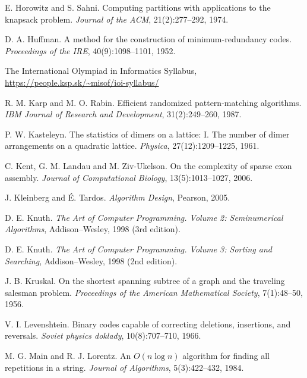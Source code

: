 \begin{thebibliography}{9}
  E. Horowitz and S. Sahni.
  Computing partitions with applications to the knapsack problem.
  \emph{Journal of the ACM}, 21(2):277--292, 1974.

  D. A. Huffman.
  A method for the construction of minimum-redundancy codes.
  \emph{Proceedings of the IRE}, 40(9):1098--1101, 1952.

  The International Olympiad in Informatics Syllabus,
  \url{https://people.ksp.sk/~misof/ioi-syllabus/}

  R. M. Karp and M. O. Rabin.
  Efficient randomized pattern-matching algorithms.
  \emph{IBM Journal of Research and Development}, 31(2):249--260, 1987.

  P. W. Kasteleyn.
  The statistics of dimers on a lattice: I. The number of dimer arrangements on a quadratic lattice.
  \emph{Physica}, 27(12):1209--1225, 1961.

  C. Kent, G. M. Landau and M. Ziv-Ukelson.
  On the complexity of sparse exon assembly.
  \emph{Journal of Computational Biology}, 13(5):1013--1027, 2006.


  J. Kleinberg and É. Tardos.
  \emph{Algorithm Design}, Pearson, 2005.

  D. E. Knuth.
  \emph{The Art of Computer Programming. Volume 2: Seminumerical Algorithms}, Addison–Wesley, 1998 (3rd edition).

  D. E. Knuth.
  \emph{The Art of Computer Programming. Volume 3: Sorting and Searching}, Addison–Wesley, 1998 (2nd edition).


  J. B. Kruskal.
  On the shortest spanning subtree of a graph and the traveling salesman problem.
  \emph{Proceedings of the American Mathematical Society}, 7(1):48--50, 1956.

  V. I. Levenshtein.
  Binary codes capable of correcting deletions, insertions, and reversals.
  \emph{Soviet physics doklady}, 10(8):707--710, 1966.

  M. G. Main and R. J. Lorentz.
  An $O(n \log n)$ algorithm for finding all repetitions in a string.
  \emph{Journal of Algorithms}, 5(3):422--432, 1984.



\end{thebibliography}
